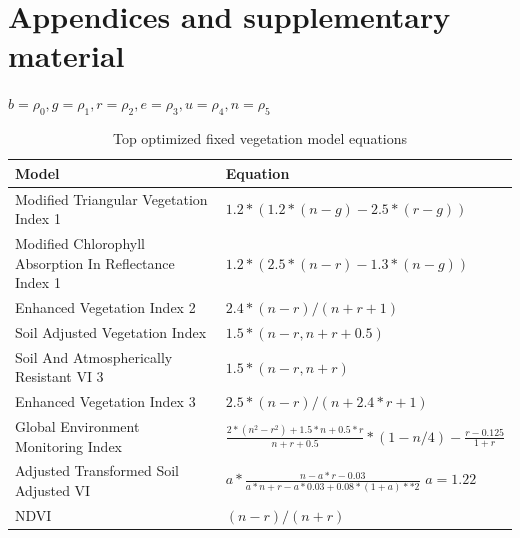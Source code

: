 \documentclass[../thesis.tex]{subfiles}
\begin{document}
	\section*{Appendices and supplementary material}
	\label{sec:appendices}
	
	\begin{table}[H]
		\centering
		$b = \rho_{0}, g = \rho_{1}, r = \rho_{2}, e = \rho_{3}, u = \rho_{4}, n = \rho_{5}$ \\
		\begin{tabular}{|l|l|}
			\hline \textbf{Model}  &	\textbf{Equation} \\ \hline
			
			Modified Triangular Vegetation Index 1                 & {$1.2*(1.2*(n-g)-2.5*(r-g))$} \\
			Modified Chlorophyll Absorption In Reflectance Index 1 & {$1.2*(2.5*(n-r)-1.3*(n-g))$} \\
			Enhanced Vegetation Index 2                            & {$2.4*(n-r) / (n+r+1)$} \\
			Soil Adjusted Vegetation Index                         & {$1.5*(n-r, n+r+0.5)$} \\
			Soil And Atmospherically Resistant VI 3  			   & {$1.5*(n-r, n+r)$} \\
			Enhanced Vegetation Index 3                            & {$2.5*(n-r) / (n+2.4*r+1)$} \\
			Global Environment Monitoring Index                    & {$\frac{2*(n^2 -r^2)+1.5*n+0.5*r}{n+r+0.5} * (1-n/4) - \frac{r-0.125}{1+r}$} \\
			Adjusted Transformed Soil Adjusted VI                  & {$a*\frac{n-a*r-0.03}{a*n+r-a*0.03+0.08*(1+a)**2}$ $a=1.22$} \\
			NDVI                                                   & {$(n-r) / (n+r)$} \\ \hline
		\end{tabular}
		\caption{Top optimized fixed vegetation model equations}
		\label{tab:fixed-veg-indices-eqn}
	\end{table}
	
\end{document}
